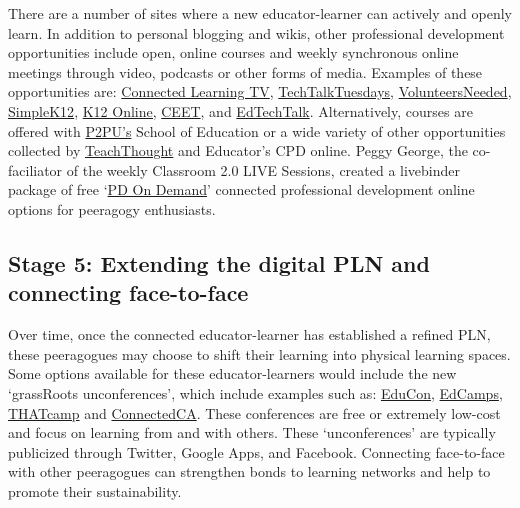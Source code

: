 There are a number of sites where a new educator-learner can actively
and openly learn. In addition to personal blogging and wikis, other
professional development opportunities include open, online courses and
weekly synchronous online meetings through video, podcasts or other
forms of media. Examples of these opportunities are:
\href{http://connectedlearning.tv/howard-rheingold-social-media-and-peer-learning-mediated-pedagogy-peeragogy}{Connected
Learning TV},
\href{http://techtalktuesdays.global2.vic.edu.au/}{TechTalkTuesdays},
\href{http://learning2gether.pbworks.com/w/page/32206114/volunteersneeded}{VolunteersNeeded},
\href{http://simplek12.com/webinars}{SimpleK12},
\href{http://k12onlineconference.org/}{K12 Online,}
\href{http://www.learnnowbc.ca/educators/moodlemeets/default.aspx}{CEET},
and \href{http://edtechtalk.com/taxonomy/term/130}{EdTechTalk}.
Alternatively, courses are offered with
\href{https://p2pu.org/en/schools/school-of-ed-pilot/}{P2PU's} School of
Education or a wide variety of other opportunities collected by
\href{http://www.teachthought.com/}{TeachThought} and Educator's CPD
online. Peggy George, the co-faciliator of the weekly Classroom 2.0 LIVE
Sessions, created a livebinder package of free
`\href{http://www.google.com/url?q=http\%3A\%2F\%2Fwww.livebinders.com\%2Fplay\%2Fplay\_or\_edit\%3Fid\%3D429095\&sa=D\&sntz=1\&usg=AFQjCNHCIdRn64rPwske2vP7xrpWolb-jA}{PD
On Demand}' connected professional development online options for
peeragogy enthusiasts.

\subsection{Stage 5: Extending the digital PLN and connecting
face-to-face}

Over time, once the connected educator-learner has established a refined
PLN, these peeragogues may choose to shift their learning into physical
learning spaces. Some options available for these educator-learners
would include the new `grassRoots unconferences', which include examples
such as: \href{http://educonphilly.org/}{EduCon},
\href{http://davidwees.com/content/what-edcamp}{EdCamps},
\href{http://thatcamp.org/}{THATcamp} and
\href{http://connectedcanada.org/}{ConnectedCA}. These conferences are
free or extremely low-cost and focus on learning from and with others.
These `unconferences' are typically publicized through Twitter, Google
Apps, and Facebook. Connecting face-to-face with other peeragogues can
strengthen bonds to learning networks and help to promote their
sustainability.


